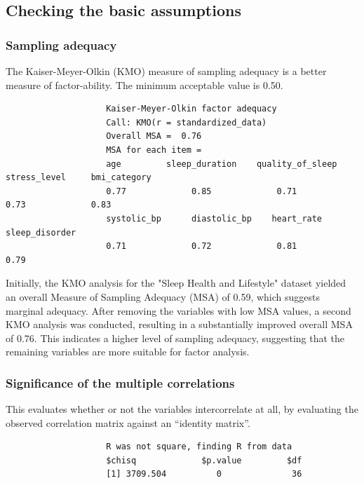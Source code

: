 \documentclass[11pt]{article}
\begin{document}
		\subsection{Checking the basic assumptions}
			\subsubsection{Sampling adequacy}
			The Kaiser-Meyer-Olkin (KMO) measure of sampling adequacy is a better measure of factor-ability. The minimum acceptable value is 0.50. \par
			
			\begin{tcolorbox}[colback=white,colframe=black]
				\begin{verbatim}
					Kaiser-Meyer-Olkin factor adequacy
					Call: KMO(r = standardized_data)
					Overall MSA =  0.76
					MSA for each item = 
					age         sleep_duration    quality_of_sleep     stress_level     bmi_category 
					0.77             0.85             0.71             0.73             0.83 
					systolic_bp      diastolic_bp    heart_rate        sleep_disorder 
					0.71             0.72             0.81             0.79 
				\end{verbatim}
			\end{tcolorbox}
			
			Initially, the KMO analysis for the "Sleep Health and Lifestyle" dataset yielded an overall Measure of Sampling Adequacy (MSA) of 0.59, which suggests marginal adequacy. After removing the variables with low MSA values, a second KMO analysis was conducted, resulting in a substantially improved overall MSA of 0.76. This indicates a higher level of sampling adequacy, suggesting that the remaining variables are more suitable for factor analysis.
			
			\subsubsection{Significance of the multiple correlations}
			This evaluates whether or not the variables intercorrelate at all, by evaluating the observed correlation matrix against an “identity matrix”.
			
			\begin{tcolorbox}[colback=white,colframe=black]
				\begin{verbatim}
					R was not square, finding R from data
					$chisq             $p.value	        $df
					[1] 3709.504          0              36
				\end{verbatim}
			\end{tcolorbox}
			
\end{document}
